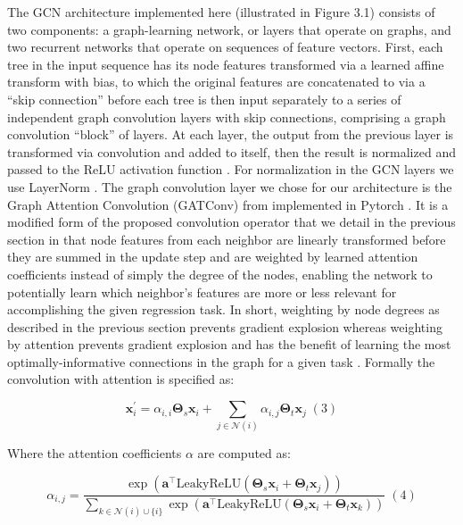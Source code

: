 The GCN architecture implemented here (illustrated in Figure 3.1) consists of two components: a graph-learning network, or layers that operate on graphs, and two recurrent networks that operate on sequences of feature vectors. First, each tree in the input sequence has its node features transformed via a learned affine transform with bias, to which the original features are concatenated to via a “skip connection” before each tree is then input separately to a series of independent graph convolution layers with skip connections, comprising a graph convolution “block” of layers. At each layer, the output from the previous layer is transformed via convolution and added to itself, then the result is normalized and passed to the ReLU activation function \cite{agarapDeepLearningUsing2018}. For normalization in the GCN layers we use LayerNorm \cite{baLayerNormalization2016}. The graph convolution layer we chose for our architecture is the Graph Attention Convolution (GATConv) from \cite{brodyHowAttentiveAre2022} implemented in Pytorch \cite{paszkePyTorchImperativeStyle2019}. It is a modified form of the proposed convolution operator that we detail in the previous section in that node features from each neighbor are linearly transformed before they are summed in the update step and are weighted by learned attention coefficients instead of simply the degree of the nodes, enabling the network to potentially learn which neighbor's features are more or less relevant for accomplishing the given regression task. In short, weighting by node degrees as described in the previous section prevents gradient explosion whereas weighting by attention prevents gradient explosion and has the benefit of learning the most optimally-informative connections in the graph for a given task \cite{brodyHowAttentiveAre2022}. Formally the convolution with attention is specified as: 

$$\mathbf{x}^{\prime}_i = \alpha_{i,i}\mathbf{\Theta}_{s}\mathbf{x}_{i} + \sum_{j \in \mathcal{N}(i)} \alpha_{i,j}\mathbf{\Theta}_{t}\mathbf{x}_{j} \;(3)$$

Where the attention coefficients $\alpha$ are computed as:

$$\alpha_{i,j} = \frac{\exp\left(\mathbf{a}^{\top}\mathrm{LeakyReLU}\left(\mathbf{\Theta}_{s} \mathbf{x}_i + \mathbf{\Theta}_{t} \mathbf{x}_j\right)\right)}{\sum_{k \in \mathcal{N}(i) \cup \{ i \}}\exp\left(\mathbf{a}^{\top}\mathrm{LeakyReLU}\left(\mathbf{\Theta}_{s} \mathbf{x}_i + \mathbf{\Theta}_{t} \mathbf{x}_k \right)\right)} \;(4)$$

